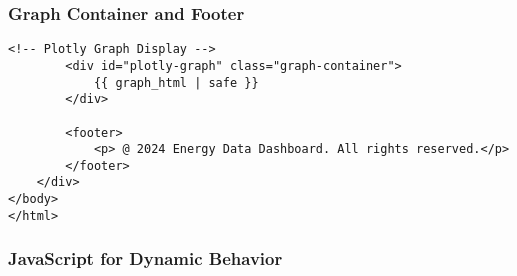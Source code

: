 \subsubsection{Graph Container and Footer}
\begin{lstlisting}[style=HTML, caption={Graph Container and Footer}]
        <!-- Plotly Graph Display -->
        <div id="plotly-graph" class="graph-container">
            {{ graph_html | safe }}
        </div>

        <footer>
            <p> @ 2024 Energy Data Dashboard. All rights reserved.</p>
        </footer>
    </div>
</body>
</html>
\end{lstlisting}

\subsubsection{JavaScript for Dynamic Behavior}
